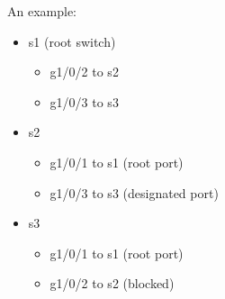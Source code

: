 \documentclass{article}
\begin{document}
\noindent An example:
\begin{itemize}
\item s1 (root switch)
	\begin{itemize}
	\item g1/0/2 to s2
	\item g1/0/3 to s3
	\end{itemize}
\item s2
	\begin{itemize}
	\item g1/0/1 to s1 (root port)
	\item g1/0/3 to s3 (designated port)
	\end{itemize}
\item s3
	\begin{itemize}
	\item g1/0/1 to s1 (root port)
	\item g1/0/2 to s2 (blocked)
	\end{itemize}
\end{itemize}
\end{document}
